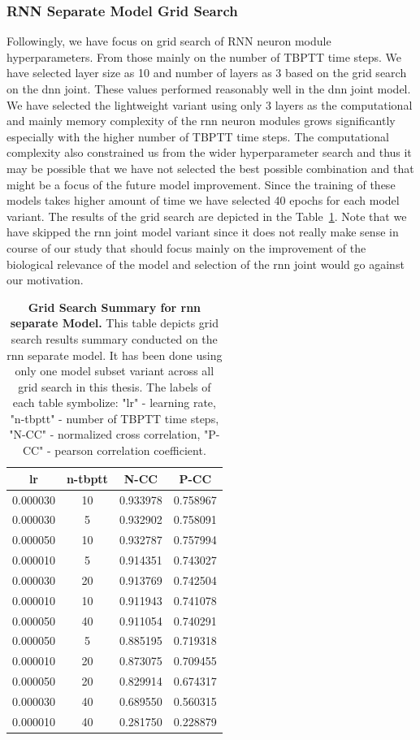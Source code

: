 \subsubsection{RNN Separate Model Grid Search}
\label{subsubsec:rnn_grid_search}
Followingly, we have focus on grid search of RNN neuron module hyperparameters. From those mainly on the number of TBPTT time steps. We have selected layer size as 10 and number of layers as 3 based on the grid search on the dnn joint. These values performed reasonably well in the dnn joint model. We have selected the lightweight variant using only 3 layers as the computational and mainly memory complexity of the rnn neuron modules grows significantly especially with the higher number of TBPTT time steps. The computational complexity also constrained us from the wider hyperparameter search and thus it may be possible that we have not selected the best possible combination and that might be a focus of the future model improvement. Since the training of these models takes higher amount of time we have selected 40 epochs for each model variant. The results of the grid search are depicted in the Table~\ref{tab:grid_rnn_separate}. Note that we have skipped the rnn joint model variant since it does not really make sense in course of our study that should focus mainly on the improvement of the biological relevance of the model and selection of the rnn joint would go against our motivation.

\begin{table}
    \centering\footnotesize\sf
    \begin{tabular}{cccc}
    \toprule
    lr & n-tbptt & N-CC & P-CC \\
    \midrule
    0.000030 & 10 & 0.933978 & 0.758967 \\
    0.000030 & 5 & 0.932902 & 0.758091 \\
    0.000050 & 10 & 0.932787 & 0.757994 \\
    0.000010 & 5 & 0.914351 & 0.743027 \\
    0.000030 & 20 & 0.913769 & 0.742504 \\
    0.000010 & 10 & 0.911943 & 0.741078 \\
    0.000050 & 40 & 0.911054 & 0.740291 \\
    0.000050 & 5 & 0.885195 & 0.719318 \\
    0.000010 & 20 & 0.873075 & 0.709455 \\
    0.000050 & 20 & 0.829914 & 0.674317 \\
    0.000030 & 40 & 0.689550 & 0.560315 \\
    0.000010 & 40 & 0.281750 & 0.228879 \\
    \bottomrule
    \end{tabular}
    \caption{\textbf{Grid Search Summary for rnn separate Model.} This table depicts grid search results summary conducted on the rnn separate model. It has been done using only one model subset variant across all grid search in this thesis. The labels of each table symbolize: "lr" - learning rate, "n-tbptt" - number of TBPTT time steps, "N-CC" - normalized cross correlation, "P-CC" - pearson correlation coefficient.}
    \label{tab:grid_rnn_separate}
\end{table}

